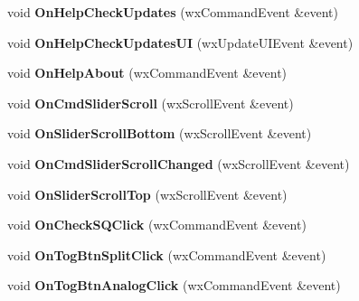 \begin{DoxyCompactItemize}
\item 
\hypertarget{class_main_frame_ac7eac67418976a65c8fc98e12924042b}{void {\bfseries On\-Help\-Check\-Updates} (wx\-Command\-Event \&event)}\label{class_main_frame_ac7eac67418976a65c8fc98e12924042b}

\item 
\hypertarget{class_main_frame_ae82ea0e5f4f7299d52943ea6b85aa957}{void {\bfseries On\-Help\-Check\-Updates\-U\-I} (wx\-Update\-U\-I\-Event \&event)}\label{class_main_frame_ae82ea0e5f4f7299d52943ea6b85aa957}

\item 
\hypertarget{class_main_frame_a1761b6b588beed7b8965d9b0b2b561cc}{void {\bfseries On\-Help\-About} (wx\-Command\-Event \&event)}\label{class_main_frame_a1761b6b588beed7b8965d9b0b2b561cc}

\item 
\hypertarget{class_main_frame_a844e8058f4e8869af084cb35643a0c6c}{void {\bfseries On\-Cmd\-Slider\-Scroll} (wx\-Scroll\-Event \&event)}\label{class_main_frame_a844e8058f4e8869af084cb35643a0c6c}

\item 
\hypertarget{class_main_frame_aeda570594ad6ca298ade6b2dec5812c4}{void {\bfseries On\-Slider\-Scroll\-Bottom} (wx\-Scroll\-Event \&event)}\label{class_main_frame_aeda570594ad6ca298ade6b2dec5812c4}

\item 
\hypertarget{class_main_frame_a09fe6aa48627dd153964d44e9d80afa0}{void {\bfseries On\-Cmd\-Slider\-Scroll\-Changed} (wx\-Scroll\-Event \&event)}\label{class_main_frame_a09fe6aa48627dd153964d44e9d80afa0}

\item 
\hypertarget{class_main_frame_af7e0da6a850c5f08fd726280b7dc0af4}{void {\bfseries On\-Slider\-Scroll\-Top} (wx\-Scroll\-Event \&event)}\label{class_main_frame_af7e0da6a850c5f08fd726280b7dc0af4}

\item 
\hypertarget{class_main_frame_a648c966a7d7ba7c86b0c404cb8f97361}{void {\bfseries On\-Check\-S\-Q\-Click} (wx\-Command\-Event \&event)}\label{class_main_frame_a648c966a7d7ba7c86b0c404cb8f97361}

\item 
\hypertarget{class_main_frame_ad4c37f5ff0d7131df3450f8caab155d3}{void {\bfseries On\-Tog\-Btn\-Split\-Click} (wx\-Command\-Event \&event)}\label{class_main_frame_ad4c37f5ff0d7131df3450f8caab155d3}

\item 
\hypertarget{class_main_frame_af237b0cdbd857d4cc72f5a523457eb82}{void {\bfseries On\-Tog\-Btn\-Analog\-Click} (wx\-Command\-Event \&event)}\label{class_main_frame_af237b0cdbd857d4cc72f5a523457eb82}


\end{DoxyCompactItemize}
